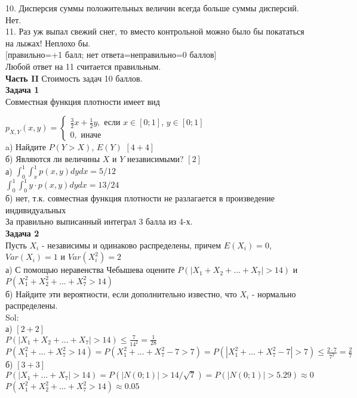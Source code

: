 \documentclass[pdftex,12pt,a4paper]{article}
\begin{document}
10. Дисперсия суммы положительных величин всегда больше суммы дисперсий. Нет. \\

11. Раз уж выпал свежий снег, то вместо контрольной можно
было бы покататься на лыжах! Неплохо бы. \\


$[$правильно=+1 балл; нет ответа=неправильно=0 баллов$]$ \\
Любой ответ на 11 считается правильным. \\




\pagebreak \textbf{Часть II} Стоимость задач 10 баллов. \\

\textbf{Задача 1} \\ %
Совместная функция плотности имеет вид

$p_{X,Y} \left(x,y\right)=
\left\{
\begin{array}{l} 
{\frac{3}{2}x+\frac{1}{2}y, \text{ если } x\in \left[0;1\right],\, y\in \left[0;1\right]} \\
{0,\text{ иначе} } 
\end{array}\right. $\\
a) Найдите  $P\left(Y>X\right)$,  $E\left(Y\right)$ $[4+4]$ \\
б) Являются ли величины $X$ и $Y$ независимыми? $[2]$ \\

а) $\int_{0}^{1}\int_{x}^{1}p(x,y)dydx=5/12$ \\
$\int_{0}^{1}\int_{0}^{1}y\cdot p(x,y)dydx=13/24$ \\
б) нет, т.к. совместная функция плотности не разлагается в произведение индивидуальных \\
За правильно выписанный интеграл 3 балла из 4-х. \\



\textbf{Задача 2} \\ %
Пусть $X_{i}$ - независимы и одинаково распределены, причем $E(X_{i})=0$, $Var(X_{i})=1$ и $Var(X_{i}^{2})=2$ \\
а) С помощью неравенства Чебышева оцените $P(|X_{1}+X_{2}+...+X_{7}|>14)$ и $P(X_{1}^{2}+X_{2}^{2}+...+X_{7}^{2}>14)$ \\
б) Найдите эти вероятности, если дополнительно известно, что $X_{i}$ - нормально распределены. \\
Sol: \\
а) $[2+2]$ \\
$P(|X_{1}+X_{2}+...+X_{7}|>14)\leq \frac{7}{14^2}=\frac{1}{28}$ \\
$P(X_{1}^{2}+...+X_{7}^{2}>14)=P(X_{1}^{2}+...+X_{7}^{2}-7>7)=P(|X_{1}^{2}+...+X_{7}^{2}-7|>7)\leq \frac{2\cdot 7}{7^2}=\frac{2}{7}$ \\
б) $[3+3]$ \\
$P(|X_{1}+...+X_{7}|>14)=P(|N(0;1)|>14/\sqrt{7})=P(|N(0;1)|>5.29)\approx 0$ \\
$P(X_{1}^{2}+X_{2}^{2}+...+X_{7}^{2}>14)\approx 0.05$ \\
\end{document}
